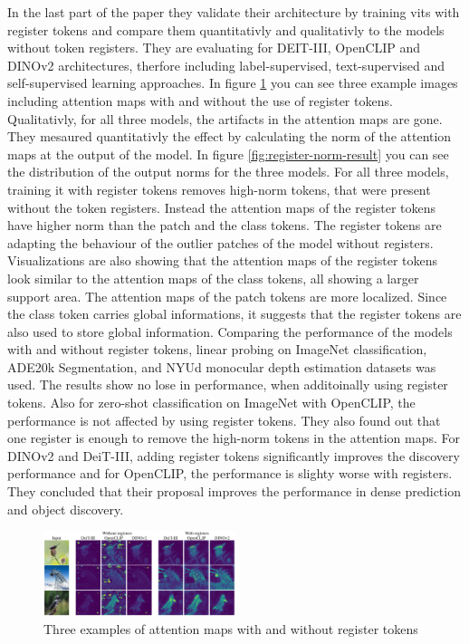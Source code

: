 \documentclass[conference]{IEEEtran}
\begin{document}
  In the last part of the paper they validate their architecture by training \acp{vit} with register tokens and compare them  quantitativly and qualitativly to the models without token registers. They are evaluating for DEIT-III, OpenCLIP and DINOv2 architectures, therfore including label-supervised, text-supervised and self-supervised learning approaches. In figure \ref{fig:register-result} you can see three example images including attention maps with and without the use of register tokens. Qualitativly, for all three models, the artifacts in the attention maps are gone. They mesaured quantitativly the effect by calculating the norm of the attention maps at the output of the model. In figure \ref{fig:register-norm-result} you can see the distribution of the output norms for the three models. For all three models, training it with register tokens removes high-norm tokens, that were present without the token registers. Instead the attention maps of the register tokens have  higher norm than the patch and the class tokens. The register tokens are adapting the behaviour of the outlier patches of the model without registers. Visualizations are also showing that the attention maps of the register tokens look similar to the attention maps of the class tokens, all showing a larger support area. The attention maps of the patch tokens are more localized. Since the class token carries global informations, it suggests that the register tokens are also used to store global information. 
  Comparing the performance of the models with and without register tokens, linear probing on ImageNet classification, ADE20k Segmentation, and NYUd monocular depth estimation datasets was used. The results show no lose in performance, when additoinally using register tokens. Also for zero-shot classification on ImageNet with OpenCLIP, the performance is not affected by using register tokens. They also found out that one register is enough to remove the high-norm tokens in the attention maps. For DINOv2 and DeiT-III, adding register tokens significantly improves the discovery performance and for OpenCLIP, the performance is slighty worse with registers. They concluded that their proposal improves the performance in dense prediction and object discovery.

  \begin{figure}
    \centering
    \includegraphics[width=0.5\textwidth]{figures/register-result.png}
    \caption{Three examples of attention maps with and without register tokens \cite{registers}}
    \label{fig:register-result}
  \end{figure}
\end{document}
